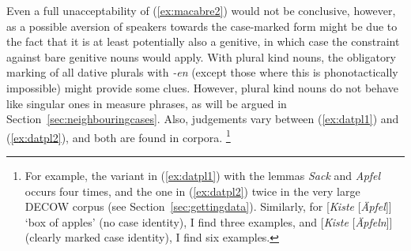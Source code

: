 \begin{exe}
  \ex\label{ex:macabre}
  \begin{xlist}
  \end{xlist}
\end{exe}

Even a full unacceptability of (\ref{ex:macabre2}) would not be conclusive, however, as a possible aversion of speakers towards the case-marked form might be due to the fact that it is at least potentially also a genitive, in which case the constraint against bare genitive nouns would apply.
With plural kind nouns, the obligatory marking of all dative plurals with \textit{-en} (except those where this is phonotactically impossible) might provide some clues.
However, plural kind nouns do not behave like singular ones in measure phrases, as will be argued in Section~\ref{sec:neighbouringcases}.
Also, judgements vary between (\ref{ex:datpl1}) and (\ref{ex:datpl2}), and both are found in corpora.%
\footnote{For example, the variant in (\ref{ex:datpl1}) with the lemmas \textit{Sack} and \textit{Apfel} occurs four times, and the one in (\ref{ex:datpl2}) twice in the very large DECOW corpus (see Section~\ref{sec:gettingdata}).
Similarly, for [\textit{Kiste} [\textit{Äpfel}]] `box of apples' (no case identity), I find three examples, and [\textit{Kiste} [\textit{Äpfeln}]] (clearly marked case identity), I find six examples.
}

\begin{exe}
  \ex\label{ex:datpl} 
  \begin{xlist}
  \end{xlist}
\end{exe}


